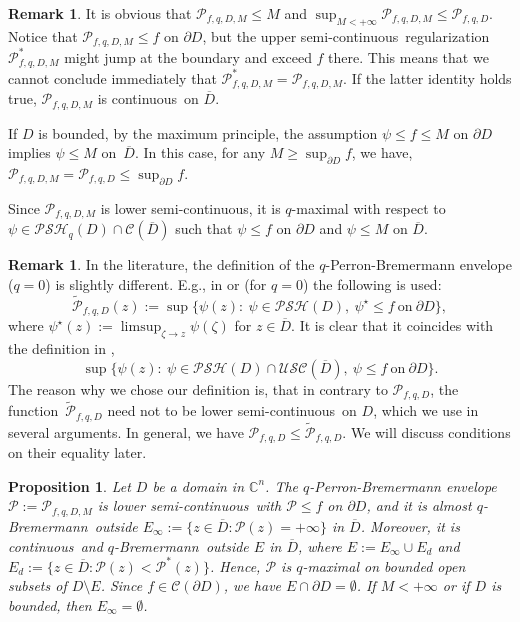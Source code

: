 \documentclass[reqno]{amsart}
\newtheorem{prop}[thm]{Proposition}
\theoremstyle{definition}
\newtheorem{rem}[thm]{Remark}
\numberwithin{equation}{section}
\newcommand{\cbb}{\mathbb{C}}
\newcommand{\ccal}{\mathcal{C}}
\newcommand{\pcal}{\mathcal{P}}
\newcommand{\USC}{\mathcal{USC}}
\newcommand{\qbrem}{$q$-Bremermann}
\newcommand{\PSH}{\mathcal{PSH}}
\newcommand{\cont}{continuous}
\newcommand{\usc}{upper semi-continuous}
\newcommand{\lsc}{lower semi-continuous}
\newcommand{\fct}{function}
\newcommand{\cld}{\overline{D}}
\begin{document}
\begin{rem} It is obvious that $\pcal_{f,q,D,M} \leq M$ and $\sup_{M<+\infty} \pcal_{f,q,D,M} \leq \pcal_{f,q,D}$. Notice that $\pcal_{f,q,D,M} \leq f$ on $\partial D$, but the \usc\ regularization $\pcal_{f,q,D,M}^*$ might jump at the boundary and exceed $f$ there. This means that we cannot conclude immediately that $\pcal_{f,q,D,M}^*=\pcal_{f,q,D,M}$. If the latter identity holds true, $\pcal_{f,q,D,M}$ is \cont\ on $\cld$.

If $D$ is bounded, by the maximum principle, the assumption $\psi \leq f \leq M$ on $\partial D$ implies $\psi \leq M$ on~$\cld$. In this case, for any $M \geq \sup_{\partial D} f$, we have, $\pcal_{f,q,D,M}  = \pcal_{f,q,D} \leq \sup_{\partial D} f$. 

Since $\pcal_{f,q,D,M}$ is \lsc, it is $q$-maximal with respect to $\psi \in \PSH_q(D) \cap \ccal(\cld)$ such that $\psi \leq f$ on $\partial D$ and $\psi \leq M$ on $\cld$.
\end{rem}

\begin{rem}\label{rem-slightly} In the literature, the definition of the $q$-Perron-Bremermann envelope ($q=0$) is slightly different. E.g., in \cite{NH} or \cite{NTT} (for $q=0$) the following is used:
\[
\widetilde{\pcal}_{f,q,D}(z):=\sup\{\psi(z) : \ \psi \in \PSH(D), \ \psi^{\star} \leq f \ \text{on}\ \partial D\},
\]
where $\psi^{\star}(z):=\limsup_{\zeta \to z}\psi(\zeta)$ for $z \in \cld$. It is clear that it coincides with the definition in \cite{HM},
\[
\sup\{\psi(z) : \ \psi \in \PSH(D)\cap\USC(\cld), \ \psi \leq f \ \text{on}\ \partial D\}.
\]
The reason why we chose our definition is, that in contrary to $\pcal_{f,q,D}$, the \fct\ $\widetilde{\pcal}_{f,q,D}$ need not to be \lsc\ on $D$, which we use in several arguments. In general, we have $\pcal_{f,q,D} \leq \widetilde{\pcal}_{f,q,D}$. We will discuss conditions on their equality later.
\end{rem}


\begin{prop}\label{prop-q-envelope} Let $D$ be a domain in $\cbb^n$. The $q$-Perron-Bremermann envelope $\pcal:=\pcal_{f,q,D,M}$ is \lsc\ with $\pcal \leq f$ on $\partial D$, and it is almost \qbrem\ outside $E_{\infty}:=\{z \in \cld : \pcal(z)=+\infty\}$ in $\cld$. Moreover, it is \cont\ and \qbrem\ outside $E$ in $\cld$, where $E:=E_\infty \cup E_d$ and $E_d:=\{z \in \cld : \pcal(z) < \pcal^*(z)\}$. Hence, $\pcal$ is $q$-maximal on bounded open subsets of $D\setminus E$. Since $f \in \ccal(\partial D)$, we have $E \cap \partial D = \emptyset$. If $M<+\infty$ or if $D$ is bounded, then $E_\infty=\emptyset$.
\end{prop}
\end{document}

